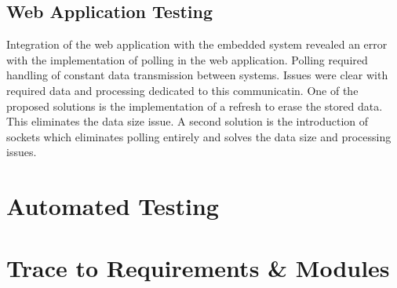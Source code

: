 \documentclass[12pt, titlepage]{article}
\begin{document}
\subsection{Web Application Testing}
Integration of the web application with the embedded system revealed an error 
with the implementation of polling in the web application. Polling required 
handling of constant data transmission between systems. Issues were clear with 
required data and processing dedicated to this communicatin. One of the proposed
solutions is the implementation of a refresh to erase the stored data. This 
eliminates the data size issue. A second solution is the introduction of sockets
which eliminates polling entirely and solves the data size and processing issues. 


\section{Automated Testing}
		
\section{Trace to Requirements \& Modules}
\end{document}
